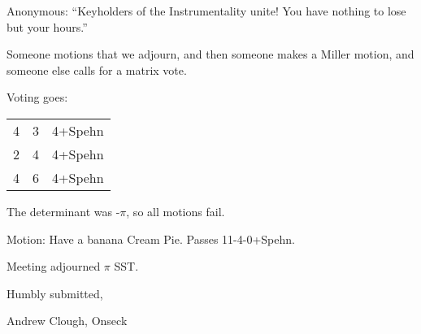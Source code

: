\documentclass[12pt]{article}
\begin{document}
Anonymous:  ``Keyholders of the Instrumentality unite!  You have nothing to lose but your hours.''

Someone motions that we adjourn, and then someone makes a Miller motion, and someone else calls for a matrix vote.

Voting goes:

\begin{tabular}{clr}
4& 3& 4+Spehn\\ 2& 4& 4+Spehn\\ 4& 6& 4+Spehn\\
\end{tabular}

The determinant was -$\pi$, so all motions fail.

Motion:  Have a banana Cream Pie.  Passes 11-4-0+Spehn.

\vspace{12pt}

\noindent
Meeting adjourned $\pi$ SST.

\vspace{18pt}

\centerline{Humbly submitted,}
\centerline{Andrew Clough, Onseck}
\end{document}
